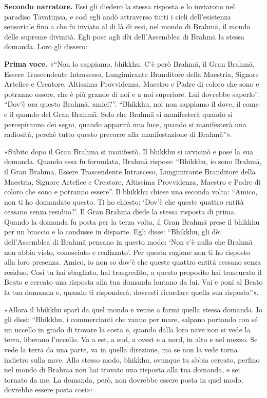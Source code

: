 \textbf{Secondo narratore.} Essi gli diedero la stessa risposta e lo inviarono
nel paradiso Tāvatiṃsa, e così egli andò attraverso tutti i cieli
dell’esistenza sensoriale fino a che fu inviato al di là di essi, nel
mondo di Brahmā, il mondo delle supreme divinità. Egli pose agli dèi
dell’Assemblea di Brahmā la stessa domanda. Loro gli dissero:


\textbf{Prima voce.} «“Non lo sappiamo, bhikkhu. C’è però Brahmā, il Gran Brahmā,
Essere Trascendente Intrasceso, Lungimirante Branditore della Maestria,
Signore Artefice e Creatore, Altissima Provvidenza, Maestro e Padre di
coloro che sono e potranno essere, che è più grande di noi e a noi
superiore. Lui dovrebbe saperlo”. “Dov’è ora questo Brahmā, amici?”.
“Bhikkhu, noi non sappiamo il dove, il come e il quando del Gran Brahmā.
Solo che Brahmā si manifesterà quando si percepiranno dei segni, quando
apparirà una luce, quando si manifesterà una radiosità, perché tutto
questo precorre alla manifestazione di Brahmā”».


«Subito dopo il Gran Brahmā si manifestò. Il bhikkhu si avvicinò e pose
la sua domanda. Quando essa fu formulata, Brahmā rispose: “Bhikkhu, io
sono Brahmā, il Gran Brahmā, Essere Trascendente Intrasceso,
Lungimirante Branditore della Maestria, Signore Artefice e Creatore,
Altissima Provvidenza, Maestro e Padre di coloro che sono e potranno
essere”. Il bhikkhu chiese una seconda volta: “Amico, non ti ho
domandato questo. Ti ho chiesto: ‘Dov’è che queste quattro entità
cessano senza residuo?’. Il Gran Brahmā diede la stessa risposta di
prima. Quando la domanda fu posta per la terza volta, il Gran Brahmā
prese il bhikkhu per un braccio e lo condusse in disparte. Egli disse:
“Bhikkhu, gli dèi dell’Assemblea di Brahmā pensano in questo modo: ‘Non
c’è nulla che Brahmā non abbia visto, conosciuto e realizzato’. Per
questa ragione non ti ho risposto alla loro presenza. Amico, io non so
dov’è che queste quattro entità cessano senza residuo. Così tu hai
sbagliato, hai trasgredito, a questo proposito hai trascurato il Beato e
cercato una risposta alla tua domanda lontano da lui. Vai e poni al
Beato la tua domanda e, quando ti risponderà, dovresti ricordare quella
sua risposta”».


«Allora il bhikkhu sparì da quel mondo e venne a farmi quella stessa
domanda. Io gli dissi: “Bhikkhu, i commercianti che vanno per mare,
salpano portando con sé un uccello in grado di trovare la costa e,
quando dalla loro nave non si vede la terra, liberano l’uccello. Va a
est, a sud, a ovest e a nord, in alto e nel mezzo. Se vede la terra da
una parte, va in quella direzione, ma se non la vede torna indietro
sulla nave. Allo stesso modo, bhikkhu, ovunque tu abbia cercato, perfino
nel mondo di Brahmā non hai trovato una risposta alla tua domanda, e sei
tornato da me. La domanda, però, non dovrebbe essere posta in quel modo,
dovrebbe essere posta così»:


